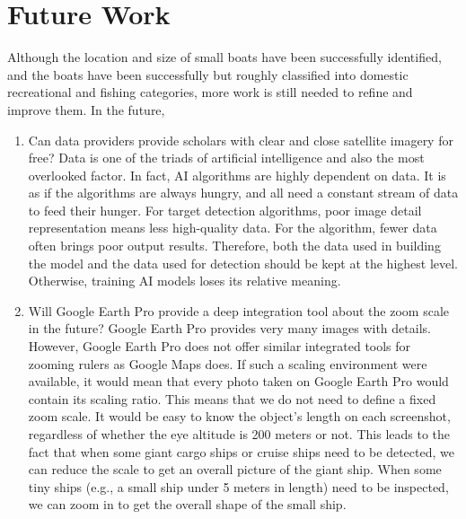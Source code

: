  
 \section{Future Work}
Although the location and size of small boats have been successfully identified, and the boats have been successfully but roughly classified into domestic recreational and fishing categories, more work is still needed to refine and improve them. In the future,

\begin{enumerate}
    \item Can data providers provide scholars with clear and close satellite imagery for free? Data is one of the triads of artificial intelligence and also the most overlooked factor. In fact, AI algorithms are highly dependent on data. It is as if the algorithms are always hungry, and all need a constant stream of data to feed their hunger. For target detection algorithms, poor image detail representation means less high-quality data. For the algorithm, fewer data often brings poor output results. Therefore, both the data used in building the model and the data used for detection should be kept at the highest level. Otherwise, training AI models loses its relative meaning.
    
    \item Will Google Earth Pro provide a deep integration tool about the zoom scale in the future? Google Earth Pro provides very many images with details. However, Google Earth Pro does not offer similar integrated tools for zooming rulers as Google Maps does. If such a scaling environment were available, it would mean that every photo taken on Google Earth Pro would contain its scaling ratio. This means that we do not need to define a fixed zoom scale. It would be easy to know the object's length on each screenshot, regardless of whether the eye altitude is 200 meters or not. This leads to the fact that when some giant cargo ships or cruise ships need to be detected, we can reduce the scale to get an overall picture of the giant ship. When some tiny ships (e.g., a small ship under 5 meters in length) need to be inspected, we can zoom in to get the overall shape of the small ship.
    

\end{enumerate}
